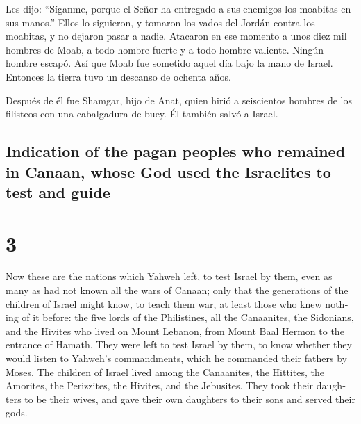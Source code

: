 \begin{paracol}{2}
 Les dijo: ``Síganme, porque el Señor ha entregado a sus
enemigos los moabitas en sus manos.'' Ellos lo siguieron, y tomaron los
vados del Jordán contra los moabitas, y no dejaron pasar a nadie.
 Atacaron en ese momento a unos diez mil hombres de Moab,
a todo hombre fuerte y a todo hombre valiente. Ningún hombre escapó.
 Así que Moab fue sometido aquel día bajo la mano de
Israel. Entonces la tierra tuvo un descanso de ochenta años.

 Después de él fue Shamgar, hijo de Anat, quien hirió a
seiscientos hombres de los filisteos con una cabalgadura de buey. Él
también salvó a Israel.

\switchcolumn
\begin{otherlanguage}{english}

\hypertarget{indication-of-the-pagan-peoples-who-remained-in-canaan-whose-god-used-the-israelites-to-test-and-guide}{%
\subsection{Indication of the pagan peoples who remained in Canaan,
whose God used the Israelites to test and
guide}\label{indication-of-the-pagan-peoples-who-remained-in-canaan-whose-god-used-the-israelites-to-test-and-guide}}

\hypertarget{section-5}{%
\section{3}\label{section-5}}

 Now these are the nations which Yahweh left, to test
Israel by them, even as many as had not known all the wars of Canaan;
 only that the generations of the children of Israel might
know, to teach them war, at least those who knew nothing of it before:
 the five lords of the Philistines, all the Canaanites,
the Sidonians, and the Hivites who lived on Mount Lebanon, from Mount
Baal Hermon to the entrance of Hamath.  They were left to
test Israel by them, to know whether they would listen to Yahweh's
commandments, which he commanded their fathers by Moses. 
The children of Israel lived among the Canaanites, the Hittites, the
Amorites, the Perizzites, the Hivites, and the Jebusites. 
They took their daughters to be their wives, and gave their own
daughters to their sons and served their gods.

\hypertarget{the-first-judges-othniel-ehud-and-shamgar}{%
}
\end{otherlanguage}
\end{paracol}
